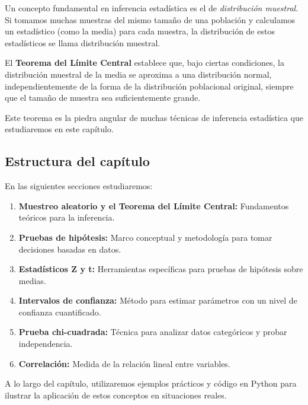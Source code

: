 Un concepto fundamental en inferencia estadística es el de \emph{distribución muestral}. Si tomamos muchas muestras del mismo tamaño de una población y calculamos un estadístico (como la media) para cada muestra, la distribución de estos estadísticos se llama distribución muestral.

El \textbf{Teorema del Límite Central} establece que, bajo ciertas condiciones, la distribución muestral de la media se aproxima a una distribución normal, independientemente de la forma de la distribución poblacional original, siempre que el tamaño de muestra sea suficientemente grande.

Este teorema es la piedra angular de muchas técnicas de inferencia estadística que estudiaremos en este capítulo.

\subsection*{Estructura del capítulo}

En las siguientes secciones estudiaremos:

\begin{enumerate}
	\item \textbf{Muestreo aleatorio y el Teorema del Límite Central:} Fundamentos teóricos para la inferencia.
	\item \textbf{Pruebas de hipótesis:} Marco conceptual y metodología para tomar decisiones basadas en datos.
	\item \textbf{Estadísticos Z y t:} Herramientas específicas para pruebas de hipótesis sobre medias.
	\item \textbf{Intervalos de confianza:} Método para estimar parámetros con un nivel de confianza cuantificado.
	\item \textbf{Prueba chi-cuadrada:} Técnica para analizar datos categóricos y probar independencia.
	\item \textbf{Correlación:} Medida de la relación lineal entre variables.
\end{enumerate}

A lo largo del capítulo, utilizaremos ejemplos prácticos y código en Python para ilustrar la aplicación de estos conceptos en situaciones reales.
